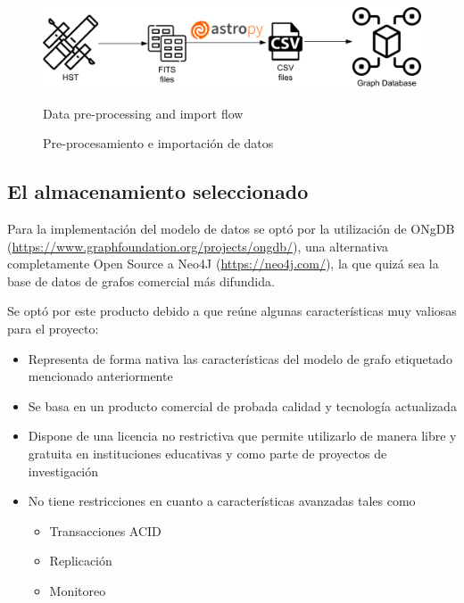 	\begin{figure}[h]
		\includegraphics[width=\linewidth]{./images/importacion-datos}
		\ifdefined\ingles
		\caption{Data pre-processing and import flow}
		\else
		\caption{Pre-procesamiento e importación de datos}
		\fi
		\label{fig:importacion-datos}
	\end{figure}
	
	\subsection{El almacenamiento seleccionado}
	
	Para la implementación del modelo de datos se optó por la utilización de ONgDB (\url{https://www.graphfoundation.org/projects/ongdb/}), una alternativa completamente Open Source a Neo4J (\url{https://neo4j.com/}), la que quizá sea la base de datos de grafos comercial más difundida.
	
	Se optó por este producto debido a que reúne algunas características muy valiosas para el proyecto:
	
	\begin{itemize}
		\item Representa de forma nativa las características del modelo de grafo etiquetado mencionado anteriormente
		\item Se basa en un producto comercial de probada calidad y tecnología actualizada
		\item Dispone de una licencia no restrictiva que permite utilizarlo de manera libre y gratuita en instituciones educativas y como parte de proyectos de investigación
		\item No tiene restricciones en cuanto a características avanzadas tales como
		\begin{itemize}
			\item Transacciones ACID
			\item Replicación
			\item Monitoreo
		\end{itemize}
	\end{itemize}
	
